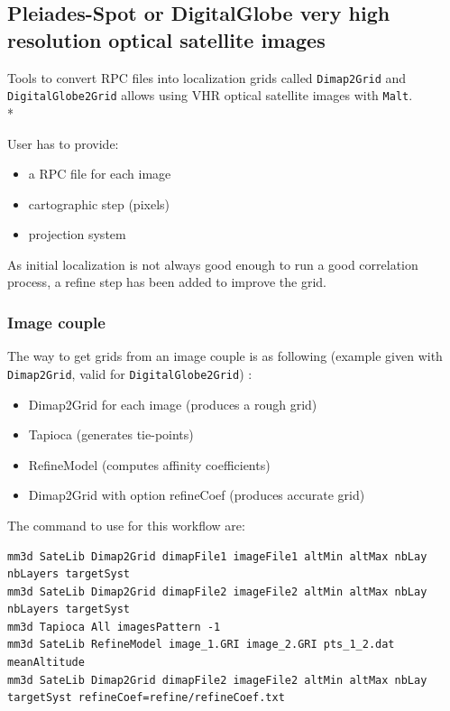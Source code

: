 \subsection{Pleiades-Spot or DigitalGlobe very high resolution optical satellite images}

Tools to convert RPC files into localization grids called {\tt Dimap2Grid} and {\tt DigitalGlobe2Grid} allows using VHR optical satellite images with {\tt Malt}.\\*

User has to provide:
\begin{itemize}
\item a RPC file for each image
\item cartographic step (pixels)
\item projection system
\end{itemize}

As initial localization is not always good enough to run a good correlation process, a refine step has been added to improve the grid.

\subsubsection{Image couple}

The way to get grids from an image couple is as following (example given with {\tt Dimap2Grid}, valid for {\tt DigitalGlobe2Grid}) :

\begin{itemize}
\item Dimap2Grid for each image (produces a rough grid)
\item Tapioca (generates tie-points)
\item RefineModel (computes affinity coefficients)
\item Dimap2Grid with option refineCoef (produces accurate grid)
\end{itemize}

The command to use for this workflow are:
\begin{verbatim}
mm3d SateLib Dimap2Grid dimapFile1 imageFile1 altMin altMax nbLay  nbLayers targetSyst
mm3d SateLib Dimap2Grid dimapFile2 imageFile2 altMin altMax nbLay  nbLayers targetSyst
mm3d Tapioca All imagesPattern -1
mm3d SateLib RefineModel image_1.GRI image_2.GRI pts_1_2.dat meanAltitude
mm3d SateLib Dimap2Grid dimapFile2 imageFile2 altMin altMax nbLay targetSyst refineCoef=refine/refineCoef.txt
\end{verbatim}

